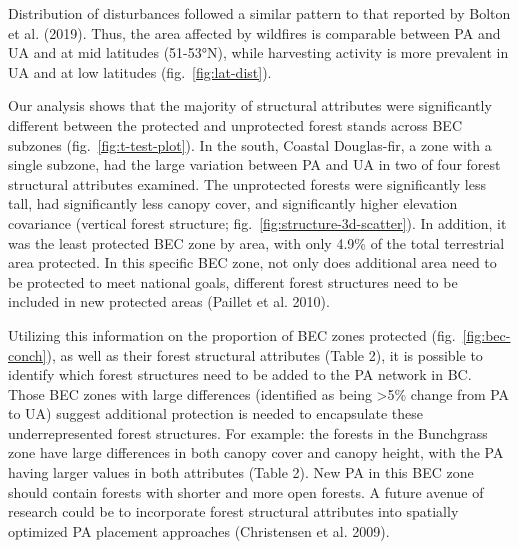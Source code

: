 \documentclass[10pt,oneside]{article}
\begin{document}
Distribution of disturbances followed a similar pattern to that reported
by Bolton et al. (2019). Thus, the area affected by wildfires is
comparable between PA and UA and at mid latitudes (51-53°N), while
harvesting activity is more prevalent in UA and at low latitudes
(fig.~\ref{fig:lat-dist}).

Our analysis shows that the majority of structural attributes were
significantly different between the protected and unprotected forest
stands across BEC subzones (fig.~\ref{fig:t-test-plot}). In the south,
Coastal Douglas-fir, a zone with a single subzone, had the large
variation between PA and UA in two of four forest structural attributes
examined. The unprotected forests were significantly less tall, had
significantly less canopy cover, and significantly higher elevation
covariance (vertical forest structure;
fig.~\ref{fig:structure-3d-scatter}). In addition, it was the least
protected BEC zone by area, with only 4.9\% of the total terrestrial
area protected. In this specific BEC zone, not only does additional area
need to be protected to meet national goals, different forest structures
need to be included in new protected areas (Paillet et al. 2010).

Utilizing this information on the proportion of BEC zones protected
(fig.~\ref{fig:bec-conch}), as well as their forest structural
attributes (Table 2), it is possible to identify which forest structures
need to be added to the PA network in BC. Those BEC zones with large
differences (identified as being \textgreater5\% change from PA to UA)
suggest additional protection is needed to encapsulate these
underrepresented forest structures. For example: the forests in the
Bunchgrass zone have large differences in both canopy cover and canopy
height, with the PA having larger values in both attributes (Table 2).
New PA in this BEC zone should contain forests with shorter and more
open forests. A future avenue of research could be to incorporate forest
structural attributes into spatially optimized PA placement approaches
(Christensen et al. 2009).
\end{document}
